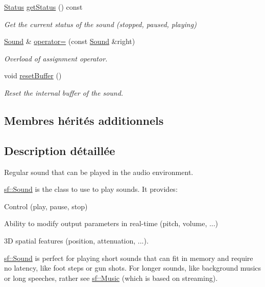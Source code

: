 \begin{DoxyCompactItemize}
\hyperlink{classsf_1_1SoundSource_ac43af72c98c077500b239bc75b812f03}{Status} \hyperlink{classsf_1_1Sound_a406fc363594a7718a53ebef49a870f51}{get\+Status} () const
\begin{DoxyCompactList}\small\item\em Get the current status of the sound (stopped, paused, playing) \end{DoxyCompactList}\item 
\hyperlink{classsf_1_1Sound}{Sound} \& \hyperlink{classsf_1_1Sound_a08c64c9c1dabeebc59fbf2540d81d4dd}{operator=} (const \hyperlink{classsf_1_1Sound}{Sound} \&right)
\begin{DoxyCompactList}\small\item\em Overload of assignment operator. \end{DoxyCompactList}\item 
void \hyperlink{classsf_1_1Sound_acb7289d45e06fb76b8292ac84beb82a7}{reset\+Buffer} ()
\begin{DoxyCompactList}\small\item\em Reset the internal buffer of the sound. \end{DoxyCompactList}\end{DoxyCompactItemize}
\subsection*{Membres hérités additionnels}


\subsection{Description détaillée}
Regular sound that can be played in the audio environment. 

\hyperlink{classsf_1_1Sound}{sf\+::\+Sound} is the class to use to play sounds. It provides\+: \begin{DoxyItemize}
\item Control (play, pause, stop) \item Ability to modify output parameters in real-\/time (pitch, volume, ...) \item 3D spatial features (position, attenuation, ...).\end{DoxyItemize}
\hyperlink{classsf_1_1Sound}{sf\+::\+Sound} is perfect for playing short sounds that can fit in memory and require no latency, like foot steps or gun shots. For longer sounds, like background musics or long speeches, rather see \hyperlink{classsf_1_1Music}{sf\+::\+Music} (which is based on streaming).

